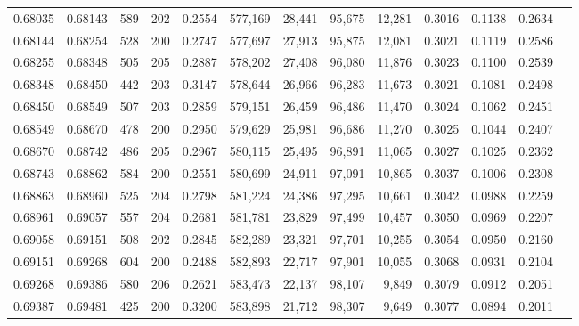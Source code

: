 \begin{tabular}{rrrrrrrrrrrrr}
0.68035 & 0.68143 &   589 & 202 &                                     0.2554 & 577,169 &  28,441 &  95,675 &  12,281 & 0.3016 & 0.1138 & 0.2634 \\
0.68144 & 0.68254 &   528 & 200 &                                     0.2747 & 577,697 &  27,913 &  95,875 &  12,081 & 0.3021 & 0.1119 & 0.2586 \\
0.68255 & 0.68348 &   505 & 205 &                                     0.2887 & 578,202 &  27,408 &  96,080 &  11,876 & 0.3023 & 0.1100 & 0.2539 \\
0.68348 & 0.68450 &   442 & 203 &                                     0.3147 & 578,644 &  26,966 &  96,283 &  11,673 & 0.3021 & 0.1081 & 0.2498 \\
0.68450 & 0.68549 &   507 & 203 &                                     0.2859 & 579,151 &  26,459 &  96,486 &  11,470 & 0.3024 & 0.1062 & 0.2451 \\
0.68549 & 0.68670 &   478 & 200 &                                     0.2950 & 579,629 &  25,981 &  96,686 &  11,270 & 0.3025 & 0.1044 & 0.2407 \\
0.68670 & 0.68742 &   486 & 205 &                                     0.2967 & 580,115 &  25,495 &  96,891 &  11,065 & 0.3027 & 0.1025 & 0.2362 \\
0.68743 & 0.68862 &   584 & 200 &                                     0.2551 & 580,699 &  24,911 &  97,091 &  10,865 & 0.3037 & 0.1006 & 0.2308 \\
0.68863 & 0.68960 &   525 & 204 &                                     0.2798 & 581,224 &  24,386 &  97,295 &  10,661 & 0.3042 & 0.0988 & 0.2259 \\
0.68961 & 0.69057 &   557 & 204 &                                     0.2681 & 581,781 &  23,829 &  97,499 &  10,457 & 0.3050 & 0.0969 & 0.2207 \\
0.69058 & 0.69151 &   508 & 202 &                                     0.2845 & 582,289 &  23,321 &  97,701 &  10,255 & 0.3054 & 0.0950 & 0.2160 \\
0.69151 & 0.69268 &   604 & 200 &                                     0.2488 & 582,893 &  22,717 &  97,901 &  10,055 & 0.3068 & 0.0931 & 0.2104 \\
0.69268 & 0.69386 &   580 & 206 &                                     0.2621 & 583,473 &  22,137 &  98,107 &   9,849 & 0.3079 & 0.0912 & 0.2051 \\
0.69387 & 0.69481 &   425 & 200 &                                     0.3200 & 583,898 &  21,712 &  98,307 &   9,649 & 0.3077 & 0.0894 & 0.2011 \\

\end{tabular}
